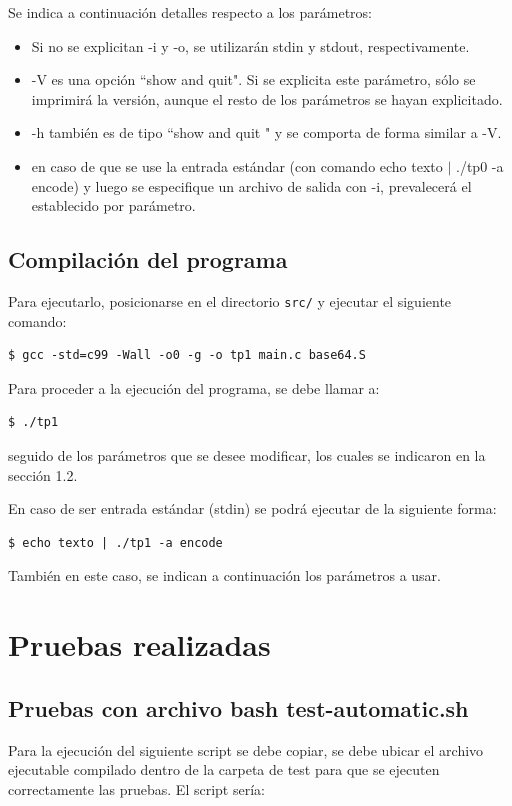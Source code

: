 \documentclass[11pt,a4paper]{article}
\begin{document}
Se indica a continuación detalles respecto a los parámetros:

\begin{itemize}
    \item Si no se explicitan -i y -o, se utilizarán stdin y stdout, respectivamente. 
    \item -V es una opción ``show and quit". Si se explicita este parámetro, sólo se imprimirá la versión, aunque el resto de los parámetros se hayan explicitado. 
    \item -h también es de tipo ``show and quit " y se comporta de forma similar a -V.
    \item en caso de que se use la entrada estándar (con comando echo texto $|$ ./tp0 -a encode) y luego se especifique un archivo de salida con -i, prevalecerá el establecido por parámetro.
\end{itemize}

\subsection{Compilación del programa}

Para ejecutarlo, posicionarse en el directorio \texttt{src/} y ejecutar el siguiente comando:
\begin{lstlisting}
$ gcc -std=c99 -Wall -o0 -g -o tp1 main.c base64.S
\end{lstlisting}

Para proceder a la ejecución del programa, se debe llamar a:

\begin{lstlisting}
$ ./tp1
\end{lstlisting}

seguido de los parámetros que se desee modificar, los cuales se indicaron en la sección 1.2.

En caso de ser entrada estándar (stdin) se podrá ejecutar de la siguiente forma:

\begin{lstlisting}
$ echo texto | ./tp1 -a encode
\end{lstlisting}

También en este caso, se indican a continuación los parámetros a usar.

\newpage


\section{Pruebas realizadas}


\subsection{Pruebas con archivo bash test-automatic.sh}
Para la ejecución del siguiente script se debe copiar, se debe ubicar el archivo ejecutable compilado dentro de la carpeta de test para que se ejecuten correctamente las pruebas. El script sería:
\end{document}

